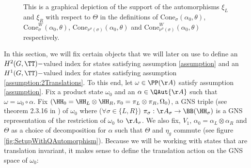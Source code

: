 \begin{figure}
{}
	\caption{This is a graphical depiction of the support of the automorphisms $\xi_L$ and $\xi_R$ with respect to $\Theta$ in the definitions of $\textrm{Cone}_{\sigma}(\alpha_0,\theta)$, $\textrm{Cone}_{\sigma}^W(\alpha_0,\theta)$, $\textrm{Cone}_{\nu^\sigma(\sigma)}(\alpha_0,\theta)$ and $\textrm{Cone}_{\nu^\sigma(\sigma)}^W(\alpha_0,\theta)$ respectively.}
	\label{fig:ConeOperators}
\end{figure}
In this section, we will fix certain objects that we will later on use to define an $H^2(G,\TT)-$valued index for states satisfying assumption \ref{assumption} and an $H^1(G,\TT)-$valued index for states satisfying assumption \ref{assumption:2Translations}. To this end, let $\omega\in\PP(\AA)$ satisfy assumption \ref{assumption}. Fix a product state $\omega_0$ and an $\alpha\in\QAut{\AA}$ such that $\omega=\omega_0\circ\alpha$. Fix $(\HH_0=\HH_L\otimes\HH_R,\pi_0=\pi_L\otimes\pi_R,\Omega_0)$, a GNS triple (see theorem 2.3.16 in \cite{bratteli1979operator}) of $\omega_0$ where ($\forall\sigma\in\{L,R\}$) $\pi_\sigma:\AA_\sigma\rightarrow\BB(\HH_\sigma)$ is a GNS representation of the restriction of $\omega_0$ to $\AA_\sigma$. We also fix, $V_1$, $\alpha_0=\alpha_L\otimes\alpha_R$ and $\Theta$ as a choice of decomposition for $\alpha$ such that $\Theta$ and $\eta_g$ commute (see figure \ref{fig:SetupWithQAutomorphism}). Because we will be working with states that are translation invariant, it makes sense to define the translation action on the GNS space of $\omega_0$:
